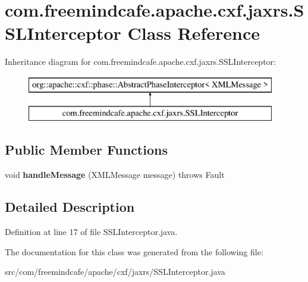 \hypertarget{classcom_1_1freemindcafe_1_1apache_1_1cxf_1_1jaxrs_1_1_s_s_l_interceptor}{}\section{com.\+freemindcafe.\+apache.\+cxf.\+jaxrs.\+S\+S\+L\+Interceptor Class Reference}
\label{classcom_1_1freemindcafe_1_1apache_1_1cxf_1_1jaxrs_1_1_s_s_l_interceptor}
Inheritance diagram for com.\+freemindcafe.\+apache.\+cxf.\+jaxrs.\+S\+S\+L\+Interceptor\+:\begin{figure}[H]
\begin{center}
\leavevmode
\includegraphics[height=2.000000cm]{classcom_1_1freemindcafe_1_1apache_1_1cxf_1_1jaxrs_1_1_s_s_l_interceptor}
\end{center}
\end{figure}
\subsection*{Public Member Functions}
\begin{DoxyCompactItemize}
\item 
\hypertarget{classcom_1_1freemindcafe_1_1apache_1_1cxf_1_1jaxrs_1_1_s_s_l_interceptor_aa2fb0874af0877968bdb17bcdfa816d2}{}void {\bfseries handle\+Message} (X\+M\+L\+Message message)  throws Fault \label{classcom_1_1freemindcafe_1_1apache_1_1cxf_1_1jaxrs_1_1_s_s_l_interceptor_aa2fb0874af0877968bdb17bcdfa816d2}

\end{DoxyCompactItemize}


\subsection{Detailed Description}


Definition at line 17 of file S\+S\+L\+Interceptor.\+java.



The documentation for this class was generated from the following file\+:\begin{DoxyCompactItemize}
\item 
src/com/freemindcafe/apache/cxf/jaxrs/S\+S\+L\+Interceptor.\+java\end{DoxyCompactItemize}
